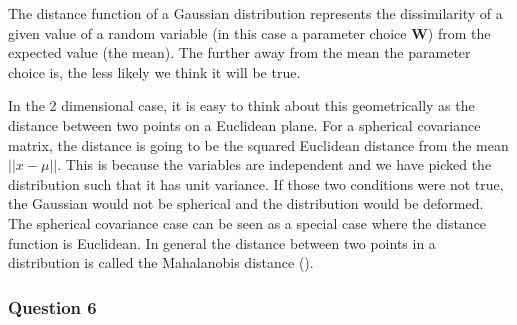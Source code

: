 \documentclass[10pt, a4paper, twocolumn]{article} %
\begin{document}
The distance function of a Gaussian distribution represents the dissimilarity of a given value of a random variable (in this case a parameter choice $\mathbf{W}$) from the expected value (the mean). The further away from the mean the parameter choice is, the less likely we think it will be true.

In the 2 dimensional case, it is easy to think about this geometrically as the distance between two points on a Euclidean plane. For a spherical covariance matrix, the distance is going to be the squared Euclidean distance from the mean $||x - \mu||$. This is because the variables are independent and we have picked the distribution such that it has unit variance. If those two conditions were not true, the Gaussian would not be spherical and the distribution would be deformed. The spherical covariance case can be seen as a special case where the distance function is Euclidean. In general the distance between two points in a distribution is called the Mahalanobis distance (\cite{mclachlan1999mahalanobis}).

\subsubsection*{Question 6}
\end{document}
